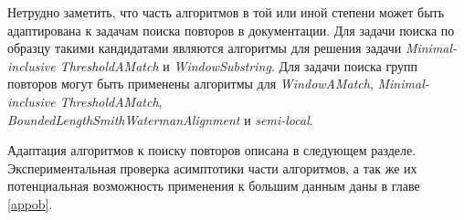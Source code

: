Нетрудно заметить, что часть алгоритмов в той или иной степени может быть адаптирована к задачам поиска повторов в документации.
Для задачи поиска по образцу такими кандидатами являются алгоритмы для решения задачи \emph{Minimal-inclusive ThresholdAMatch} и \emph{WindowSubstring}.
Для задачи поиска групп повторов могут быть применены  алгоритмы для \emph{WindowAMatch},
\emph{Minimal-inclusive ThresholdAMatch},\\\emph{BoundedLengthSmithWatermanAlignment} и \emph{semi-local}.

Адаптация алгоритмов к поиску повторов описана в следующем разделе.
Экспериментальная проверка асимптотики части алгоритмов, а так же их потенциальная возможность применения к большим данным даны в главе \ref{appob}.

